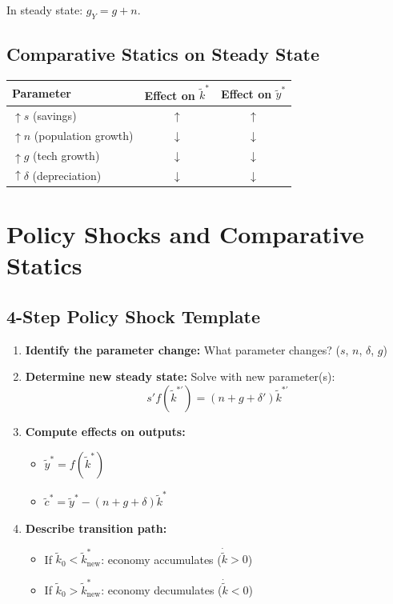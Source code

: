\documentclass[a4paper,11pt]{article}
\newcommand{\ktilde}{\tilde{k}}
\newcommand{\ytilde}{\tilde{y}}
\newcommand{\ctilde}{\tilde{c}}
\begin{document}
In steady state: $g_Y = g + n$.

\subsection*{Comparative Statics on Steady State}
\begin{center}
\begin{tabular}{lcc}
\toprule
Parameter & Effect on $\ktilde^{*}$ & Effect on $\ytilde^{*}$ \\
\midrule
$\uparrow s$ (savings) & $\uparrow$ & $\uparrow$ \\
$\uparrow n$ (population growth) & $\downarrow$ & $\downarrow$ \\
$\uparrow g$ (tech growth) & $\downarrow$ & $\downarrow$ \\
$\uparrow \delta$ (depreciation) & $\downarrow$ & $\downarrow$ \\
\bottomrule
\end{tabular}
\end{center}

\clearpage

\section{Policy Shocks and Comparative Statics}

\subsection*{4-Step Policy Shock Template}

\begin{enumerate}
    \item \textbf{Identify the parameter change:} What parameter changes? ($s$, $n$, $\delta$, $g$)
    
    \item \textbf{Determine new steady state:} Solve with new parameter(s):
    \[
    s' f(\ktilde^{*\prime}) = (n + g + \delta')\ktilde^{*\prime}
    \]
    
    \item \textbf{Compute effects on outputs:}
    \begin{itemize}
        \item $\ytilde^{*} = f(\ktilde^{*})$
        \item $\ctilde^{*} = \ytilde^{*} - (n + g + \delta)\ktilde^{*}$
    \end{itemize}
    
    \item \textbf{Describe transition path:}
    \begin{itemize}
        \item If $\ktilde_0 < \ktilde^{*}_{\text{new}}$: economy accumulates ($\dot{\ktilde} > 0$)
        \item If $\ktilde_0 > \ktilde^{*}_{\text{new}}$: economy decumulates ($\dot{\ktilde} < 0$)
    \end{itemize}
\end{enumerate}
\end{document}
